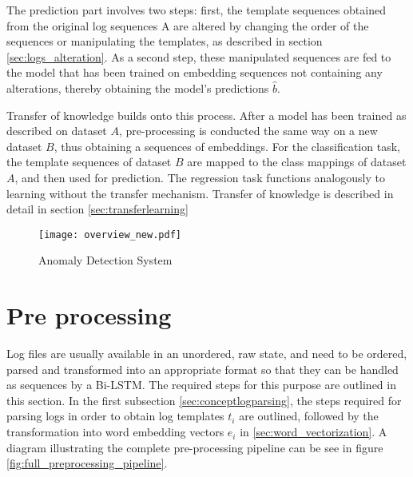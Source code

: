 The prediction part involves two steps: first, the template sequences obtained from the original log sequences A are altered by changing the order of the sequences or manipulating the templates, as described in section \ref{sec:logs_alteration}. As a second step, these manipulated sequences are fed to the model that has been trained on embedding sequences not containing any alterations, thereby obtaining the model's predictions $\hat{b}$.

Transfer of knowledge builds onto this process. After a model has been trained as described on dataset $A$, pre-processing is conducted the same way on a new dataset $B$, thus obtaining a sequences of embeddings. For the classification task, the template sequences of dataset $B$ are mapped to the class mappings of dataset $A$, and then used for prediction. The regression task functions analogously to learning without the transfer mechanism. Transfer of knowledge is described in detail in section \ref{sec:transferlearning}

\begin{figure}[h]
	\centering
	\texttt{[image: overview\_new.pdf]}
	\caption{Anomaly Detection System}
	\label{fig:overall_system}
\end{figure}

\newpage
\section{Pre processing \label{sec:pre_processing}}
Log files are usually available in an unordered, raw state, and need to be ordered, parsed and transformed into an appropriate format so that they can be handled as sequences by a Bi-LSTM. The required steps for this purpose are outlined in this section. In the first subsection \ref{sec:conceptlogparsing}, the steps required for parsing logs in order to obtain log templates $t_i$ are outlined, followed by the transformation into word embedding vectors $e_i$ in \ref{sec:word_vectorization}. A diagram illustrating the complete pre-processing pipeline can be see in figure \ref{fig:full_preprocessing_pipeline}.

